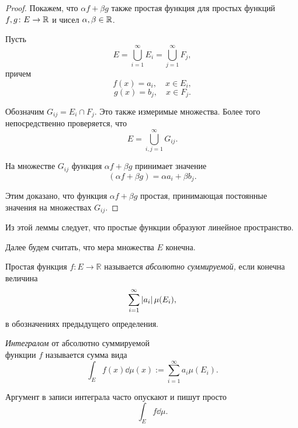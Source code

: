 \begin{proof}
    Покажем, что $\alpha f + \beta g$ также простая функция для простых функций
    $f, g \colon E \to \mathbb{R}$ и чисел $\alpha, \beta \in \mathbb{R}$.

    Пусть
    \[ E = \bigcup_{i=1}^\infty E_i = \bigcup_{j=1}^\infty F_j, \]
    причем 
    \[ f(x) = a_i, \quad x \in E_i, \]
    \[ g(x) = b_j, \quad x \in F_j. \]

    Обозначим $G_{ij} = E_i \cap F_j$. Это также измеримые множества. Более того
    непосредственно проверяется, что
    \[ E = \bigcup_{i, j = 1}^\infty G_{ij}. \]

    На множестве $G_{ij}$ функция $\alpha f + \beta g$ принимает значение
    \[ (\alpha f + \beta g) = \alpha a_i + \beta b_j. \]

    Этим доказано, что функция $\alpha f + \beta g$ простая, принимающая
    постоянные значения на множествах $G_{ij}$.
\end{proof}

Из этой леммы следует, что простые функции образуют линейное пространство.

Далее будем считать, что мера множества $E$ конечна.

\begin{definition}
    Простая функция $f \colon E \to \mathbb R$ называется \emph{абсолютно
    суммируемой,}
    если конечна величина 
    \[ \sum_{i=1}^\infty \left|a_i\right| \mu(E_i), \]
    в обозначениях предыдущего определения.
\end{definition}

\begin{definition}
    \emph{Интегралом} от абсолютно суммируемой \\ функции $f$ называется сумма вида
    \[ \int_E f(x) \dd \mu(x) := \sum_{i=1}^\infty a_i \mu(E_i). \]
\end{definition}

Аргумент в записи интеграла часто опускают и пишут просто
\[ \int_E f \dd \mu. \]

